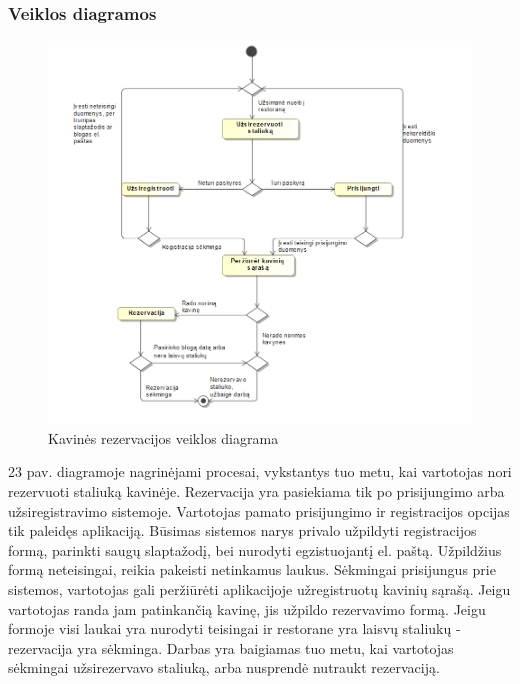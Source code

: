 \documentclass{VUMIFPSkursinis}
\begin{document}
{{{{{\subsubsection{Veiklos diagramos}
\begin{figure}[H]
    \centering
    \includegraphics[width=\textwidth,height=\textheight,keepaspectratio]{img/rezerv} 
    \caption{Kavinės rezervacijos veiklos diagrama}
    \label{img:rezerv}
\end{figure}
23 pav.   diagramoje nagrinėjami procesai, vykstantys tuo metu, kai vartotojas nori rezervuoti staliuką kavinėje. Rezervacija yra pasiekiama tik po prisijungimo arba užsiregistravimo sistemoje. Vartotojas pamato prisijungimo ir registracijos opcijas tik paleidęs aplikaciją. Būsimas sistemos narys privalo užpildyti registracijos formą, parinkti saugų slaptažodį, bei nurodyti egzistuojantį el. paštą. Užpildžius formą neteisingai, reikia pakeisti netinkamus laukus. Sėkmingai prisijungus prie sistemos, vartotojas gali peržiūrėti aplikacijoje užregistruotų kavinių sąrašą. Jeigu vartotojas randa jam patinkančią kavinę, jis užpildo rezervavimo formą. Jeigu formoje visi laukai yra nurodyti teisingai ir restorane yra laisvų staliukų - rezervacija yra sėkminga. Darbas yra baigiamas tuo metu, kai vartotojas sėkmingai užsirezervavo staliuką, arba nusprendė nutraukt rezervaciją.


}}}}}
\end{document}

